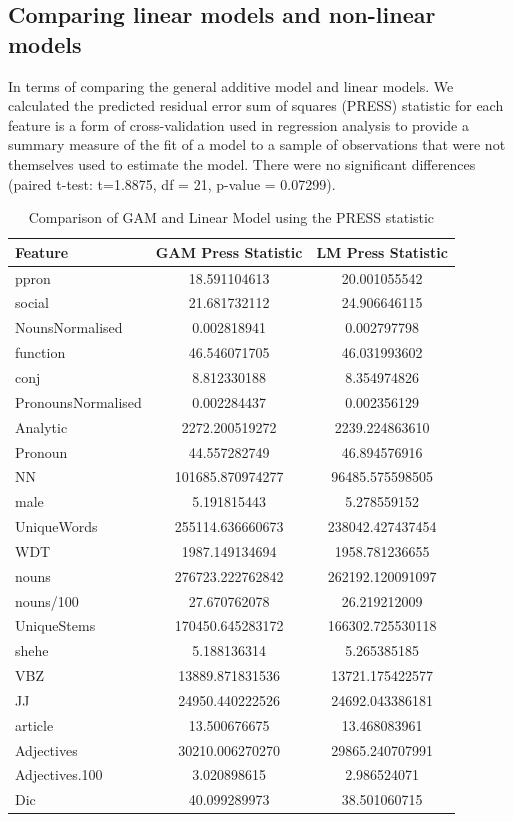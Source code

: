\documentclass[12pt]{article}
\begin{document}
\subsection{Comparing linear models and non-linear models}
In terms of comparing the general additive model and linear models. We calculated the predicted residual error sum of squares (PRESS) statistic for each feature is a form of cross-validation used in regression analysis to provide a summary measure of the fit of a model to a sample of observations that were not themselves used to estimate the model. There were no significant differences (paired t-test: t=1.8875, df  = 21, p-value = 0.07299). 

\begin{table}[H]
	\begin{center}
	\begin{tabular}{ | l | c | c |}
		\hline
		Feature & GAM Press Statistic & LM Press Statistic \\ \hline
		ppron & 18.591104613 & 20.001055542 \\ \hline
		social & 21.681732112 & 24.906646115  \\ \hline
		NounsNormalised & 0.002818941 & 0.002797798\\ \hline
		function & 46.546071705 & 46.031993602 \\ \hline
		conj & 8.812330188 & 8.354974826 \\ \hline
		PronounsNormalised & 0.002284437 & 0.002356129\\ \hline
		Analytic & 2272.200519272 & 2239.224863610 \\ \hline
		Pronoun & 44.557282749 & 46.894576916 \\ \hline		
		NN & 101685.870974277 & 96485.575598505 \\ \hline
		male & 5.191815443 & 5.278559152 \\ \hline
		UniqueWords & 255114.636660673 & 238042.427437454 \\ \hline
		WDT & 1987.149134694 & 1958.781236655 \\ \hline
		nouns & 276723.222762842 & 262192.120091097 \\ \hline
		nouns/100 & 27.670762078 & 26.219212009 \\ \hline
		UniqueStems & 170450.645283172 & 166302.725530118 \\ \hline
		shehe & 5.188136314 & 5.265385185 \\ \hline
		VBZ & 13889.871831536 & 13721.175422577 \\ \hline
		JJ & 24950.440222526 & 24692.043386181 \\ \hline
		article & 13.500676675 & 13.468083961 \\ \hline	
		Adjectives & 30210.006270270 & 29865.240707991 \\ \hline	
		Adjectives.100 & 3.020898615 & 2.986524071 \\ \hline
		Dic & 40.099289973 & 38.501060715 \\ \hline	
	\end{tabular}
	\caption{\label{tab:table-name}Comparison of GAM and Linear Model using the PRESS statistic}
	\end{center} 
\end{table}
\end{document}
